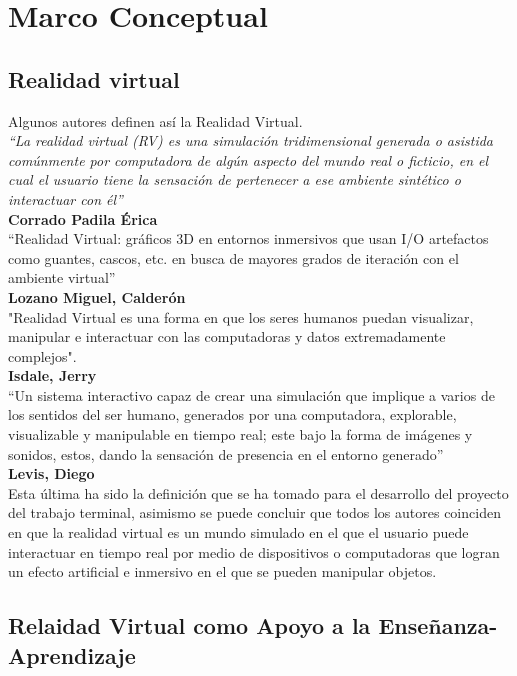 \chapter{Marco Conceptual}

\section{Realidad virtual}
Algunos autores definen así la Realidad Virtual.\\
\newline
\textit{“La realidad virtual (RV) es una simulación tridimensional generada o asistida comúnmente por computadora de algún aspecto del mundo real o ficticio, en el cual 
el usuario tiene la sensación de pertenecer a ese ambiente sintético o interactuar con él”}\cite{web6}\\ 
\textbf{Corrado Padila Érica}\\
\newline
“Realidad Virtual: gráficos 3D en entornos inmersivos que usan I/O
artefactos como guantes, cascos, etc. en busca de mayores grados de iteración
con el ambiente virtual”\cite{web7}\\ 
\textbf{Lozano Miguel, Calderón}\\
\newline
"Realidad Virtual es una forma en que los seres humanos puedan
visualizar, manipular e interactuar con las computadoras y datos extremadamente
complejos".\cite{web8}\\
\textbf{Isdale, Jerry}\\
\newline
“Un sistema interactivo capaz de crear una simulación que implique a varios de los sentidos del ser humano, generados por una computadora, explorable, visualizable y manipulable 
en tiempo real; este bajo la forma de imágenes y sonidos, estos, dando la sensación de presencia en el entorno generado”\cite{web9}\\
\textbf{Levis, Diego}\\
\newline
Esta última ha sido la definición que se ha tomado para el desarrollo del proyecto del trabajo terminal, asimismo se puede concluir que todos los autores coinciden en que la 
realidad virtual es un mundo simulado en el que el usuario puede interactuar en tiempo real por medio
de dispositivos o computadoras que logran un efecto artificial e inmersivo en el que se pueden manipular objetos.

\section{Relaidad Virtual como Apoyo a la Enseñanza-Aprendizaje}%


